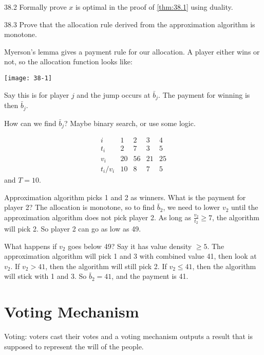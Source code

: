 \documentclass[12pt,letterpaper]{report}
\begin{document}
\begin{exer}{}{38.2}
  Formally prove $x$ is optimal in the proof of \cref{thm:38.1} using duality.
\end{exer}

\begin{exer}{}{38.3}
  Prove that the allocation rule derived from the approximation algorithm is monotone.
\end{exer}

Myerson's lemma gives a payment rule for our allocation.
A player either wins or not, so the allocation function looks like:
\begin{center}
  \texttt{[image: 38-1]}
\end{center}
Say this is for player $j$ and the jump occurs at $\bar{b}_j$.
The payment for winning is then $\bar{b}_j$.

How can we find $\bar{b}_j$?
Maybe binary search, or use some logic.

\begin{ex}
  \[
    \begin{array}{c|cccc}
      i & 1 & 2 & 3 & 4 \\
      \hline
      t_i & 2 & 7 & 3 & 5 \\
      v_i & 20 & 56 & 21 & 25 \\
      t_i / v_i & 10 & 8 & 7 & 5
    \end{array}
  \]
  and $T = 10$.

  Approximation algorithm picks 1 and 2 as winners.
  What is the payment for player 2?
  The allocation is monotone, so to find $\bar{b}_2$, we need to lower $v_2$ until the approximation
  algorithm does not pick player 2.
  As long as $\frac{v_2}{t_2} \geq 7$, the algorithm will pick 2.
  So player 2 can go as low as 49.

  What happens if $v_2$ goes below 49?
  Say it has value density $\geq 5$.
  The approximation algorithm will pick 1 and 3 with combined value 41, then look at $v_2$.
  If $v_2 > 41$, then the algorithm will still pick 2.
  If $v_2 \leq 41$, then the algorithm will stick with 1 and 3.
  So $\bar{b}_2 = 41$, and the payment is 41.
\end{ex}

\section{Voting Mechanism}

Voting: voters cast their votes and a voting mechanism outputs a result that is supposed to
represent the will of the people.
\end{document}
